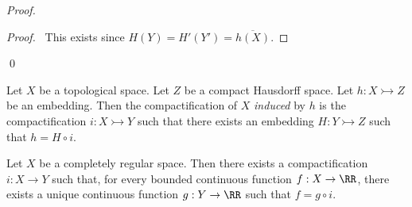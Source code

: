 \begin{proof}
    \pf
    \begin{proof}
        \pf\ This exists since $H(Y) = H'(Y') = \overline{h(X)}$.
    \end{proof}
    \qed
\end{proof}

\begin{definition}
    Let $X$ be a topological space. Let $Z$ be a compact Hausdorff space. Let $h : X \rightarrowtail Z$ be an embedding.
    Then the compactification of $X$ \emph{induced} by $h$ is the compactification $i : X \rightarrowtail Y$ such that
    there exists an embedding $H : Y \rightarrowtail Z$ such that $h = H \circ i$.
\end{definition}

\begin{theorem}
    Let $X$ be a completely regular space. Then there exists a compactification $i : X \rightarrow Y$ such that, for every
    bounded continuous function $f : X \rightarrow \RR$, there exists a unique continuous function $g : Y \rightarrow \RR$
    such that $f = g \circ i$.
\end{theorem}

